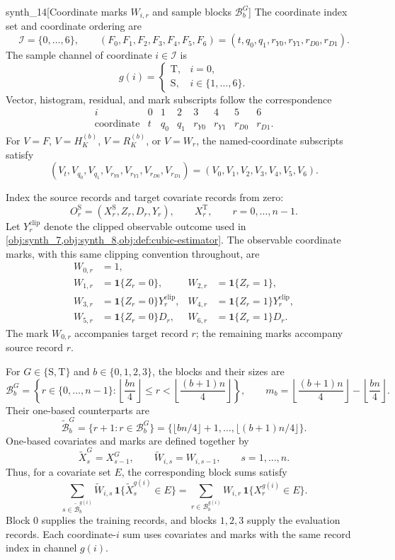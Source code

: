 \begin{definitionv}{synth_14}[Coordinate marks \(W_{i,r}\) and sample blocks \(\mathcal B_b^G\)]
The coordinate index set and coordinate ordering are
\[
\mathcal I=\{0,\ldots,6\},
\qquad
(F_0,F_1,F_2,F_3,F_4,F_5,F_6)
=(t,q_0,q_1,r_{Y0},r_{Y1},r_{D0},r_{D1}).
\]
The sample channel of coordinate \(i\in\mathcal I\) is
\[
g(i)=
\begin{cases}
\mathrm T,&i=0,\\
\mathrm S,&i\in\{1,\ldots,6\}.
\end{cases}
\]
Vector, histogram, residual, and mark subscripts follow the correspondence
\[
\begin{array}{c|ccccccc}
i&0&1&2&3&4&5&6\\ \hline
\text{coordinate}&t&q_0&q_1&r_{Y0}&r_{Y1}&r_{D0}&r_{D1}.
\end{array}
\]
For \(V=F\), \(V=H_K^{(b)}\), \(V=R_K^{(b)}\), or \(V=W_r\), the named-coordinate subscripts satisfy
\[
(V_t,V_{q_0},V_{q_1},V_{r_{Y0}},V_{r_{Y1}},V_{r_{D0}},V_{r_{D1}})
=(V_0,V_1,V_2,V_3,V_4,V_5,V_6).
\]

Index the source records and target covariate records from zero:
\[
O_r^{\mathrm S}=(X_r^{\mathrm S},Z_r,D_r,Y_r),
\qquad
X_r^{\mathrm T},
\qquad r=0,\ldots,n-1.
\]
Let \(Y_r^{\mathrm{clip}}\) denote the clipped observable outcome used in
\cref{obj:synth_7,obj:synth_8,obj:def:cubic-estimator}.
The observable coordinate marks, with this same clipping convention throughout, are
\[
\begin{aligned}
W_{0,r}&=1,\\
W_{1,r}&=\mathbf 1\{Z_r=0\},
&
W_{2,r}&=\mathbf 1\{Z_r=1\},\\
W_{3,r}&=\mathbf 1\{Z_r=0\}Y_r^{\mathrm{clip}},
&
W_{4,r}&=\mathbf 1\{Z_r=1\}Y_r^{\mathrm{clip}},\\
W_{5,r}&=\mathbf 1\{Z_r=0\}D_r,
&
W_{6,r}&=\mathbf 1\{Z_r=1\}D_r.
\end{aligned}
\]
The mark \(W_{0,r}\) accompanies target record \(r\); the remaining marks accompany source record \(r\).

For \(G\in\{\mathrm S,\mathrm T\}\) and \(b\in\{0,1,2,3\}\), the blocks and their sizes are
\[
\mathcal B_b^G
=
\left\{
r\in\{0,\ldots,n-1\}:
\left\lfloor\frac{bn}{4}\right\rfloor
\le r<
\left\lfloor\frac{(b+1)n}{4}\right\rfloor
\right\},
\qquad
m_b=\left\lfloor\frac{(b+1)n}{4}\right\rfloor
-\left\lfloor\frac{bn}{4}\right\rfloor.
\]
Their one-based counterparts are
\[
\widetilde{\mathcal B}_b^G
=\{r+1:r\in\mathcal B_b^G\}
=\{\lfloor bn/4\rfloor+1,\ldots,\lfloor(b+1)n/4\rfloor\}.
\]
One-based covariates and marks are defined together by
\[
\widetilde X_s^G=X_{s-1}^G,
\qquad
\widetilde W_{i,s}=W_{i,s-1},
\qquad s=1,\ldots,n.
\]
Thus, for a covariate set \(E\), the corresponding block sums satisfy
\[
\sum_{s\in\widetilde{\mathcal B}_b^{g(i)}}
\widetilde W_{i,s}\,
\mathbf 1\{\widetilde X_s^{g(i)}\in E\}
=
\sum_{r\in\mathcal B_b^{g(i)}}
W_{i,r}\,\mathbf 1\{X_r^{g(i)}\in E\}.
\]
Block \(0\) supplies the training records, and blocks \(1,2,3\) supply the evaluation records. Each coordinate-\(i\) sum uses covariates and marks with the same record index in channel \(g(i)\).
\end{definitionv}

